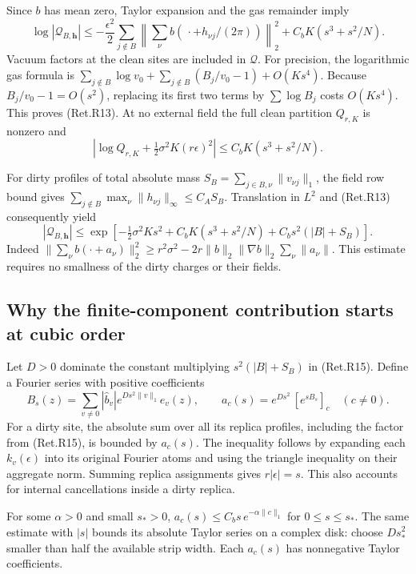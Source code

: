 Since \(b\) has mean zero, Taylor expansion and the gas remainder imply
\[
 \log|\mathcal Q_{B,\boldsymbol h}|
 \le-\frac{\epsilon^2}{2}\sum_{j\notin B}
       \left\|\sum_\nu b(\,\cdot+h_{\nu j}/(2\pi))\right\|_2^2
                          +C_bK(s^3+s^2/N).               \tag{Ret.R13}
\]
Vacuum factors at the clean sites are included in \(\mathcal Q\).
For precision, the logarithmic gas formula is
\(\sum_{j\notin B}\log v_0+\sum_{j\notin B}(B_j/v_0-1)+O(Ks^4)\).
Because \(B_j/v_0-1=O(s^2)\), replacing its first two terms by
\(\sum\log B_j\) costs \(O(Ks^4)\). This proves (Ret.R13).
At no external field the full clean partition \(Q_{r,K}\) is nonzero and
\[
 \left|\log Q_{r,K}+\tfrac12\sigma^2K(r\epsilon)^2\right|
                                   \le C_bK(s^3+s^2/N).   \tag{Ret.R14}
\]

For dirty profiles of total absolute mass
\(S_B=\sum_{j\in B,\nu}\|v_{\nu j}\|_1\), the field row bound gives
\(\sum_{j\notin B}\max_\nu\|h_{\nu j}\|_\infty\le C_AS_B\).
Translation in \(L^2\) and (Ret.R13) consequently yield
\[
 |\mathcal Q_{B,\boldsymbol h}|
 \le \exp\left[-\tfrac12\sigma^2Ks^2+C_bK(s^3+s^2/N)
                                  +C_bs^2(|B|+S_B)\right]. \tag{Ret.R15}
\]
Indeed \(\|\sum_\nu b(\cdot+a_\nu)\|_2^2 \ge r^2\sigma^2-2r\|b\|_2\|\nabla b\|_2\sum_\nu\|a_\nu\|\).
This estimate requires no smallness of the dirty charges or their fields.

\hypertarget{why-the-finite-component-contribution-starts-at-cubic-order}{%
\subsection{Why the finite-component contribution starts at cubic order}\label{why-the-finite-component-contribution-starts-at-cubic-order}}

Let \(D>0\) dominate the constant multiplying \(s^2(|B|+S_B)\) in (Ret.R15).
Define a Fourier series with positive coefficients
\[
 B_s(z)=\sum_{v\ne0}|\widehat b_v|e^{Ds^2\|v\|_1}e_v(z),
 \qquad
 a_c(s)=e^{Ds^2}\,[e^{sB_s}]_c\quad(c\ne0).                 \tag{Ret.R16}
\]
For a dirty site, the absolute sum over all its replica profiles,
including the factor from (Ret.R15), is bounded by \(a_c(s)\).
The inequality follows by expanding each \(k_v(\epsilon)\) into its
original Fourier atoms and using the triangle inequality on their
aggregate norm. Summing replica assignments gives \(r|\epsilon|=s\).
This also accounts for internal cancellations inside a dirty replica.

For some \(\alpha>0\) and small \(s_*>0\),
\(a_c(s)\le C_bs\,e^{-\alpha\|c\|_1}\) for \(0\le s\le s_*\).
The same estimate with \(|s|\) bounds its absolute Taylor series on a
complex disk: choose \(Ds_*^2\) smaller than half the available strip width.
Each \(a_c(s)\) has nonnegative Taylor coefficients.

